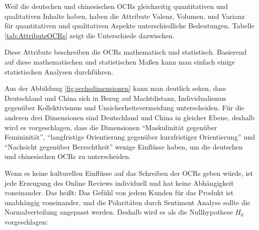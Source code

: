 \begin{table}[htb]
\centering
{}
\caption[Die Attribute der quantitativen und qualitativen OCRs]{Die Attribute der quantitativen und qualitativen \ac{OCRs} (Quelle: eigene Darstellung)}
\label{tab:AttributeOCRs}
\end{table}

Weil die deutschen und chinesischen \ac{OCRs} gleichzeitig quantitativen und qualitativen Inhalte haben, haben die Attribute Valenz, Volumen, und Varianz für quantitativen und qualitativen Aspekte unterschiedliche Bedeutungen. Tabelle \ref{tab:AttributeOCRs} zeigt die Unterschiede dazwischen.

Diese Attribute beschreiben die \ac{OCRs} mathematisch und statistisch. Basierend auf diese mathematischen und statistischen Maßen kann man einfach einige statistischen Analysen durchführen.

Aus der Abbildung \ref{fig:sechsdimensionen} kann man deutlich sehen, dass Deutschland und China sich in Bezug auf Machtdistanz, Individualismus gegenüber Kollektivismus und Unsicherheitsvermeidung unterscheiden. Für die anderen drei Dimensionen sind Deutschland und China in gleicher Ebene, deshalb wird es vorgeschlagen, dass die Dimensionen ``Maskulinität gegenüber Femininität'', ``langfristige Orientierung gegenüber kurzfristiger Orientierung'' und ``Nachsicht gegenüber Berrschtheit'' wenige Einflüsse haben, um die deutschen und chinesischen \ac{OCRs} zu unterscheiden.

Wenn es keine kulturellen Einflüsse auf das Schreiben der \ac{OCRs} geben würde, ist jede Erzeugung des Online Reviews individuell und hat keine Abhängigkeit voneinander. Das heißt: Das Gefühl von jedem Kunden für das Produkt ist unabhängig voneinander, und die Polaritäten durch Sentiment Analyse sollte die Normalverteilung angepasst werden. %
Deshalb wird es als die Nullhypothese $H_0$ vorgeschlagen:

